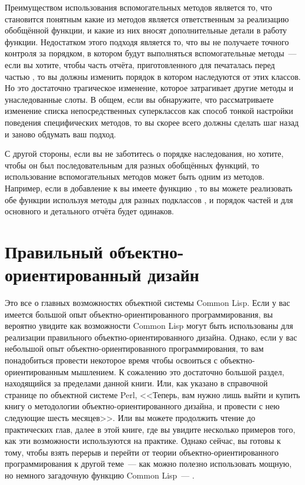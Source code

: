 Преимуществом использования вспомогательных методов является то, что становится понятным
какие из методов является ответственным за реализацию обобщённой функции, и какие из них
вносят дополнительные детали в работу функции.  Недостатком этого подходя является то, что
вы не получаете точного контроля за порядком, в котором будут выполняться вспомогательные
методы~--- если вы хотите, чтобы часть отчёта, приготовленного для 
печаталась перед частью , то вы должны изменить порядок в котором
 наследуются от этих классов.  Но это достаточно трагическое
изменение, которое затрагивает другие методы и унаследованные слоты.  В общем, если вы
обнаружите, что рассматриваете изменение списка непосредственных суперклассов как способ
тонкой настройки поведения специфических методов, то вы скорее всего должны сделать шаг
назад и заново обдумать ваш подход.

С другой стороны, если вы не заботитесь о порядке наследования, но хотите, чтобы он был
последовательным для разных обобщённых функций, то использование вспомогательных методов
может быть одним из методов.  Например, если в добавление к  вы
имеете функцию , то вы можете реализовать обе функции
используя методы для разных подклассов , и порядок частей
и для основного и детального отчёта будет одинаков.


\section{Правильный объектно-ориентированный дизайн}

Это все о главных возможностях объектной системы Common Lisp.  Если у вас имеется большой
опыт объектно-ориентированного программирования, вы вероятно увидите как возможности
Common Lisp могут быть использованы для реализации правильного объектно-ориентированного
дизайна.  Однако, если у вас небольшой опыт объектно-ориентированного программирования, то
вам понадобиться провести некоторое время чтобы освоиться с объектно-ориентированным
мышлением.  К сожалению это достаточно большой раздел, находящийся за пределами данной
книги.  Или, как указано в справочной странице по объектной системе Perl, <<Теперь, вам
нужно лишь выйти и купить книгу о методологии объектно-ориентированного дизайна, и
провести с нею следующие шесть месяцев>>.  Или вы можете продолжить чтение до практических
глав, далее в этой книге, где вы увидите несколько примеров того, как эти возможности
используются на практике.  Однако сейчас, вы готовы к тому, чтобы взять перерыв и перейти
от теории объектно-ориентированного программирования к другой теме~--- как можно полезно
использовать мощную, но немного загадочную функцию Common Lisp~--- .


